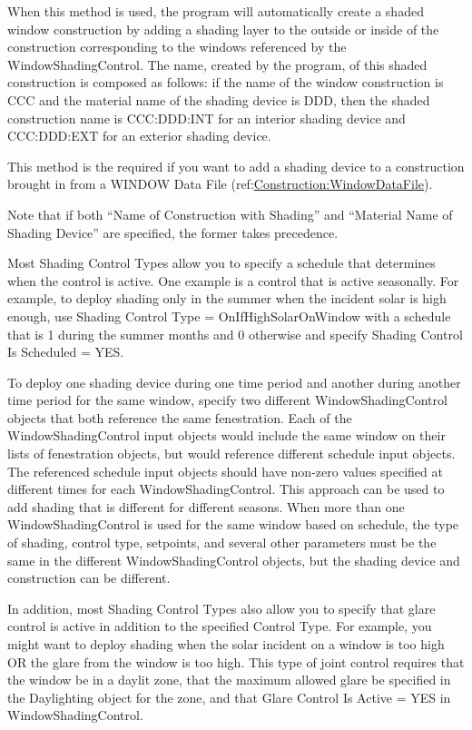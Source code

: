 \begin{itemize}
When this method is used, the program will automatically create a shaded window construction by adding a shading layer to the outside or inside of the construction corresponding to the windows referenced by the WindowShadingControl. The name, created by the program, of this shaded construction is composed as follows: if the name of the window construction is CCC and the material name of the shading device is DDD, then the shaded construction name is CCC:DDD:INT for an interior shading device and CCC:DDD:EXT for an exterior shading device.

This method is the required if you want to add a shading device to a construction brought in from a WINDOW Data File (ref:\hyperref[constructionwindowdatafile]{Construction:WindowDataFile}).

Note that if both ``Name of Construction with Shading'' and ``Material Name of Shading Device'' are specified, the former takes precedence.
\end{itemize}

Most Shading Control Types allow you to specify a schedule that determines when the control is active. One example is a control that is active seasonally. For example, to deploy shading only in the summer when the incident solar is high enough, use Shading Control Type = OnIfHighSolarOnWindow with a schedule that is 1 during the summer months and 0 otherwise and specify Shading Control Is Scheduled = YES.

To deploy one shading device during one time period and another during another time period for the same window, specify two different WindowShadingControl objects that both reference the same fenestration.  Each of the WindowShadingControl input objects would include the same window on their lists of fenestration objects, but would reference different schedule input objects. The referenced schedule input objects should have non-zero values specified at different times for each WindowShadingControl. This approach can be used to add shading that is different for different seasons. When more than one WindowShadingControl is used for the same window based on schedule, the type of shading, control type, setpoints, and several other parameters must be the same in the different WindowShadingControl objects, but the shading device and construction can be different.

In addition, most Shading Control Types also allow you to specify that glare control is active in addition to the specified Control Type. For example, you might want to deploy shading when the solar incident on a window is too high OR the glare from the window is too high. This type of joint control requires that the window be in a daylit zone, that the maximum allowed glare be specified in the Daylighting object for the zone, and that Glare Control Is Active = YES in WindowShadingControl.

